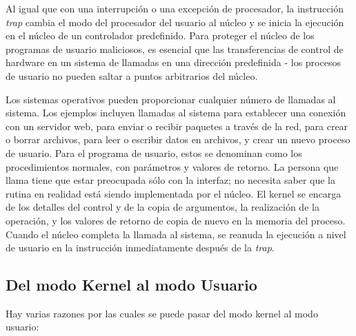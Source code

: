 \documentclass[10pt]{book}
\begin{document}
\begin{itemize}
Al igual que con una interrupción o una excepción de procesador, la instrucción \textit{trap} cambia el modo del procesador del usuario al núcleo y se inicia la ejecución en el núcleo de un controlador predefinido. Para proteger el núcleo de los programas de usuario maliciosos, es esencial que las transferencias de control de hardware en un sistema de llamadas en una dirección predefinida - los procesos de usuario no pueden saltar a puntos arbitrarios del núcleo.

Los sistemas operativos pueden proporcionar cualquier número de llamadas al sistema. Los ejemplos incluyen llamadas al sistema para establecer una conexión con un servidor web, para enviar o recibir paquetes a través de la red, para crear o borrar archivos, para leer o escribir datos en archivos, y crear un nuevo proceso de usuario. Para el programa de usuario, estos se denominan como los procedimientos normales, con parámetros y valores de retorno. La persona que llama tiene que estar preocupada sólo con la interfaz; no necesita saber que la rutina en realidad está siendo implementada por el núcleo. El kernel se encarga de los detalles del control y de la copia de argumentos, la realización de la operación, y los valores de retorno de copia de nuevo en la memoria del proceso. Cuando el núcleo completa la llamada al sistema, se reanuda la ejecución a nivel de usuario en la instrucción inmediatamente después de la \textit{trap}.
\end{itemize}

\subsection{Del modo Kernel al modo Usuario}
Hay varias razones por las cuales se puede pasar del modo kernel al modo usuario:
\end{document}
